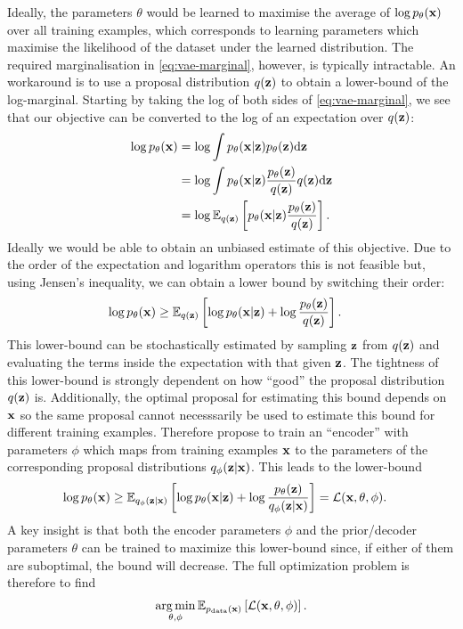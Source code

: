 Ideally, the parameters $\theta$ would be learned to
maximise the average of $\log p_\theta({\mathbf{x}})$ over all training examples, which corresponds to learning parameters which maximise the likelihood of the dataset under the learned distribution. The required marginalisation in \cref{eq:vae-marginal}, however, is typically intractable. An workaround is to use a proposal distribution $q({\mathbf{z}})$ to obtain a lower-bound of the log-marginal. Starting by taking the log of both sides of \cref{eq:vae-marginal}, we see that our objective can be converted to the log of an expectation over $q({\mathbf{z}})$:
\begin{align}
\log p_\theta({\mathbf{x}}) &= \log \int p_\theta({\mathbf{x}}|{\mathbf{z}})p_\theta({\mathbf{z}}) \mathrm{d}{\mathbf{z}} \\
    &= \log \int p_\theta({\mathbf{x}}|{\mathbf{z}}) \frac{p_\theta({\mathbf{z}})}{q({\mathbf{z}})} q({\mathbf{z}}) \mathrm{d}{\mathbf{z}} \\
    &= \log \mathbb{E}_{q({\mathbf{z}})} \left[ p_\theta({\mathbf{x}}|{\mathbf{z}}) \frac{p_\theta({\mathbf{z}})}{q({\mathbf{z}})} \right]. \label{eq:vae-marginal-is}
\end{align}
Ideally we would be able to obtain an unbiased estimate of this objective. Due to the order of the expectation and logarithm operators this is not feasible but, using Jensen's inequality, we can obtain a lower bound by switching their order: 
\begin{align}
    \log p_\theta({\mathbf{x}}) &\geq \mathbb{E}_{q({\mathbf{z}})} \left[ \log p_\theta({\mathbf{x}}|{\mathbf{z}}) + \log \frac{p_\theta({\mathbf{z}})}{q({\mathbf{z}})} \right].
\label{eq:marginal-is}
\end{align}
This lower-bound can be stochastically estimated by sampling ${\mathbf{z}}$ from $q({\mathbf{z}})$ and evaluating the terms inside the expectation with that given ${\mathbf{z}}$. The tightness of this lower-bound is strongly dependent on how ``good'' the proposal distribution $q({\mathbf{z}})$ is. Additionally, the optimal proposal for estimating this bound depends on ${\mathbf{x}}$ so the same proposal cannot necesssarily be used to estimate this bound for different training examples. Therefore \citet{kingma2013auto} propose to train an ``encoder'' with parameters $\phi$ which maps from training examples ${\mathbf{x}}$ to the parameters of the corresponding proposal distributions $q_\phi({\mathbf{z}}|{\mathbf{x}})$. This leads to the lower-bound
\begin{align} \label{eq:vae-objective}
    \log p_\theta({\mathbf{x}}) &\geq \mathbb{E}_{q_\phi({\mathbf{z}}|{\mathbf{x}})} \left[ \log p_\theta({\mathbf{x}}|{\mathbf{z}}) + \log \frac{p_\theta({\mathbf{z}})}{q_\phi({\mathbf{z}}|{\mathbf{x}})} \right] = {\mathcal{L}}({\mathbf{x}}, \theta, \phi).
\end{align}
A key insight is that both the encoder parameters $\phi$ and the prior/decoder parameters $\theta$ can be trained to maximize this lower-bound since, if either of them are suboptimal, the bound will decrease. The full optimization problem is therefore to find
\begin{align}
    \operatorname*{arg\,min}_{\theta,\phi} \mathbb{E}_{p_{\rm{data}}({\mathbf{x}})} \left[ {\mathcal{L}}({\mathbf{x}}, \theta, \phi) \right].
\end{align}

